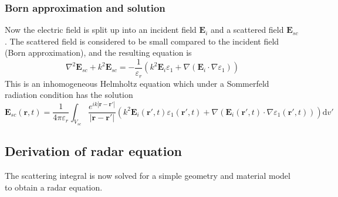 \documentclass[10pt,a4paper,draft]{scrartcl}
\begin{document}
	\subsubsection{Born approximation and solution}
	Now the electric field is split up into an incident field $\bm{E}_i$ and a scattered field $\bm{E}_{sc}$. The scattered field is considered to be small compared to the incident field (Born approximation), and the resulting equation is
	\begin{equation*}
		\nabla^2 \bm{E}_{sc} + k^2 \bm{E}_{sc} = -\frac{1}{\varepsilon_r} \left( k^2 \bm{E}_i \varepsilon_1 + \nabla (\bm{E}_i \cdot \nabla \varepsilon_1) \right)
	\end{equation*}
	This is an inhomogeneous Helmholtz equation which under a Sommerfeld radiation condition has the solution
	\begin{equation*}
		\boxed{
			\bm{E}_{sc}(\bm{r},t) = \frac{1}{4\pi\varepsilon_r} \int_{V_{sc}} \frac{e^{ik |\bm{r}-\bm{r'}| }}{ |\bm{r}-\bm{r'}|} \left( k^2 \bm{E}_i (\bm{r'},t) \varepsilon_1 (\bm{r'},t) + \nabla (\bm{E}_i (\bm{r'},t) \cdot \nabla \varepsilon_1 (\bm{r'},t)) \right) \mathrm{d}v'
			}
	\end{equation*}
	
	\subsection{Derivation of radar equation \label{app:radareq}}
	The scattering integral is now solved for a simple geometry and material model to obtain a radar equation.
	
\end{document}
